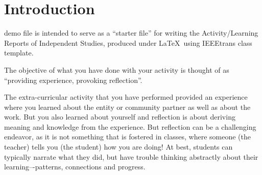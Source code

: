 \documentclass[a4paper,12pt,journal,twoside,compsoc]{PPIEEEtran}
\begin{document}


\maketitle

\IEEEdisplaynontitleabstractindextext
\IEEEpeerreviewmaketitle
\section{Introduction}
% 
% 
 demo file is intended to serve as a ``starter file''
for writing the Activity\slash Learning Reports of Independent Studies, produced under \LaTeX\ using
IEEEtrans class template.

The objective of what you have done with your activity is thought of as ``providing experience, provoking reflection''.

The extra-curricular activity that you have performed provided an experience where you learned about the entity or community partner as well as about the work. But you also learned about yourself and reflection is about deriving meaning and knowledge from the experience. But reflection can be a challenging endeavor, as it is not something that is fostered in classes, where someone (the teacher) tells you (the student) how you are doing! At best, students can typically narrate what they did, but have trouble thinking abstractly about their learning–-patterns, connections and progress.
\end{document}
